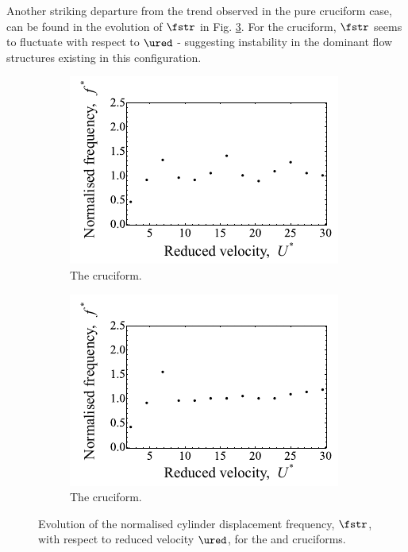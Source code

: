 \documentclass[a4paper,fleqn]{cas-sc}
\begin{document}
Another striking departure from the trend observed in the pure cruciform case, can be found in the evolution of $\fstr$ in Fig. \ref{fig:yStrFreq23}. For the \angfo{} cruciform, $\fstr$ seems to fluctuate with respect to $\ured$ - suggesting instability in the dominant flow structures existing in this configuration.

\begin{figure}
  \centering
  \begin{subfigure}[h]{0.4\textwidth}
    \includegraphics[width=\textwidth]{figs/yStrFreq4}
    \caption{The \angfo{} cruciform.}
    \label{fig:yStrFreq4}
  \end{subfigure}
  \hspace{6mm}
  \begin{subfigure}[h]{0.4\textwidth}
    \includegraphics[width=\textwidth]{figs/yStrFreq3}
    \caption{The \angth{} cruciform.}
    \label{fig:yStrFreq3}
  \end{subfigure}

  \caption{Evolution of the normalised cylinder displacement frequency, $\fstr$, with respect to reduced velocity $\ured$, for the \angfo{} and \angth{} cruciforms.}
  \label{fig:yStrFreq23}
\end{figure}
\end{document}
